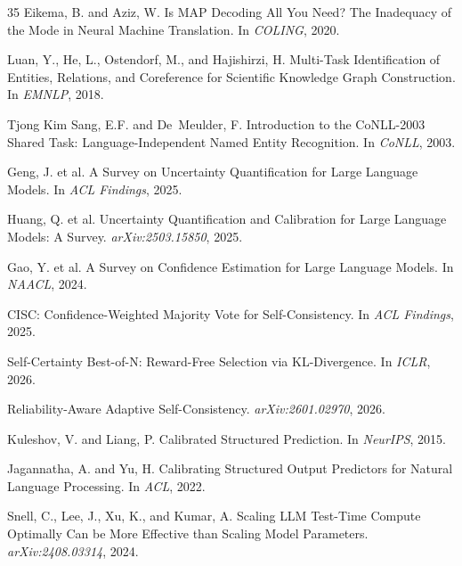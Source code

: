 \documentclass[11pt,a4paper]{article}
\begin{document}
\begin{thebibliography}{35}
Eikema, B. and Aziz, W.
\newblock Is {MAP} Decoding All You Need? {T}he Inadequacy of the Mode in Neural Machine Translation.
\newblock In \emph{COLING}, 2020.

Luan, Y., He, L., Ostendorf, M., and Hajishirzi, H.
\newblock Multi-Task Identification of Entities, Relations, and Coreference for Scientific Knowledge Graph Construction.
\newblock In \emph{EMNLP}, 2018.

Tjong Kim Sang, E.F. and De~Meulder, F.
\newblock Introduction to the {CoNLL}-2003 Shared Task: Language-Independent Named Entity Recognition.
\newblock In \emph{CoNLL}, 2003.

Geng, J. et al.
\newblock A Survey on Uncertainty Quantification for Large Language Models.
\newblock In \emph{ACL Findings}, 2025.

Huang, Q. et al.
\newblock Uncertainty Quantification and Calibration for Large Language Models: A Survey.
\newblock \emph{arXiv:2503.15850}, 2025.

Gao, Y. et al.
\newblock A Survey on Confidence Estimation for Large Language Models.
\newblock In \emph{NAACL}, 2024.

CISC: Confidence-Weighted Majority Vote for Self-Consistency.
\newblock In \emph{ACL Findings}, 2025.

Self-Certainty Best-of-N: Reward-Free Selection via KL-Divergence.
\newblock In \emph{ICLR}, 2026.

Reliability-Aware Adaptive Self-Consistency.
\newblock \emph{arXiv:2601.02970}, 2026.

Kuleshov, V. and Liang, P.
\newblock Calibrated Structured Prediction.
\newblock In \emph{NeurIPS}, 2015.

Jagannatha, A. and Yu, H.
\newblock Calibrating Structured Output Predictors for Natural Language Processing.
\newblock In \emph{ACL}, 2022.

Snell, C., Lee, J., Xu, K., and Kumar, A.
\newblock Scaling {LLM} Test-Time Compute Optimally Can be More Effective than Scaling Model Parameters.
\newblock \emph{arXiv:2408.03314}, 2024.


\end{thebibliography}
\end{document}
